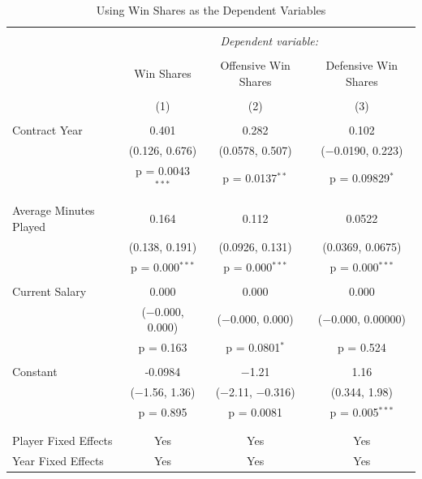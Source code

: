 \documentclass[12pt]{article}
\begin{document}
	
	\begin{landscape}
		\begin{table}[!htbp] \centering 
			\caption{Using Win Shares as the Dependent Variables} 
			\label{geewinshare} 
			\begin{tabular}{@{\extracolsep{5pt}}lccc} 
				\\[-1.8ex]\hline 
				\hline \\[-1.8ex] 
				& \multicolumn{3}{c}{\textit{Dependent variable:}} \\ 
				\cline{2-4} 
				\\[-1.8ex] & Win Shares & Offensive Win Shares & Defensive Win Shares \\ 
				\\[-1.8ex] & (1) & (2) & (3)\\ 
				\hline \\[-1.8ex] 
				Contract Year & 0.401 & 0.282 & 0.102 \\ 
				& (0.126, 0.676) & (0.0578, 0.507) & ($-$0.0190, 0.223) \\ 
				& p = 0.0043$^{***}$ & p = 0.0137$^{**}$ & p = 0.09829$^{*}$ \\ 
				& & & \\ 
				Average Minutes Played & 0.164 & 0.112 & 0.0522 \\ 
				& (0.138, 0.191) & (0.0926, 0.131) & (0.0369, 0.0675) \\ 
				& p = 0.000$^{***}$ & p = 0.000$^{***}$ & p = 0.000$^{***}$ \\ 
				& & & \\ 
				Current Salary & 0.000 & 0.000 & 0.000 \\ 
				& ($-$0.000, 0.000) & ($-$0.000, 0.000) & ($-$0.000, 0.00000) \\ 
				& p = 0.163 & p = 0.0801$^{*}$ & p = 0.524 \\ 
				& & & \\ 
				Constant & -0.0984 & $-$1.21 & 1.16 \\ 
				& ($-$1.56, 1.36) & ($-$2.11, $-$0.316) & (0.344, 1.98) \\ 
				& p = 0.895 & p = 0.0081 & p = 0.005$^{***}$ \\ 
				& & & \\ 
				\hline \\[-1.8ex] 
				Player Fixed Effects & Yes & Yes & Yes \\ 
				Year Fixed Effects & Yes & Yes & Yes \\ 

\end{tabular}
\end{table}
\end{landscape}
\end{document}
